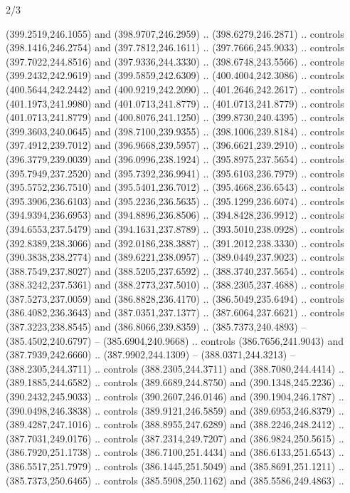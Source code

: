 \begin{flagdescription}{2/3}
\begin{scope}[xshift=0.5\flaglength,yshift=0.5\flagwidth,scale=\flagwidth/495.65]
\begin{scope}[y=0.8pt, x=0.8pt, yscale=-1,shift={(-463.76,-309.78)}]
  (399.2519,246.1055) and (398.9707,246.2959) .. (398.6279,246.2871) .. controls
  (398.1416,246.2754) and (397.7812,246.1611) .. (397.7666,245.9033) .. controls
  (397.7022,244.8516) and (397.9336,244.3330) .. (398.6748,243.5566) .. controls
  (399.2432,242.9619) and (399.5859,242.6309) .. (400.4004,242.3086) .. controls
  (400.5644,242.2442) and (400.9219,242.2090) .. (401.2646,242.2617) .. controls
  (401.1973,241.9980) and (401.0713,241.8779) .. (401.0713,241.8779) .. controls
  (401.0713,241.8779) and (400.8076,241.1250) .. (399.8730,240.4395) .. controls
  (399.3603,240.0645) and (398.7100,239.9355) .. (398.1006,239.8184) .. controls
  (397.4912,239.7012) and (396.9668,239.5957) .. (396.6621,239.2910) .. controls
  (396.3779,239.0039) and (396.0996,238.1924) .. (395.8975,237.5654) .. controls
  (395.7949,237.2520) and (395.7392,236.9941) .. (395.6103,236.7979) .. controls
  (395.5752,236.7510) and (395.5401,236.7012) .. (395.4668,236.6543) .. controls
  (395.3906,236.6103) and (395.2236,236.5635) .. (395.1299,236.6074) .. controls
  (394.9394,236.6953) and (394.8896,236.8506) .. (394.8428,236.9912) .. controls
  (394.6553,237.5479) and (394.1631,237.8789) .. (393.5010,238.0928) .. controls
  (392.8389,238.3066) and (392.0186,238.3887) .. (391.2012,238.3330) .. controls
  (390.3838,238.2774) and (389.6221,238.0957) .. (389.0449,237.9023) .. controls
  (388.7549,237.8027) and (388.5205,237.6592) .. (388.3740,237.5654) .. controls
  (388.3242,237.5361) and (388.2773,237.5010) .. (388.2305,237.4688) .. controls
  (387.5273,237.0059) and (386.8828,236.4170) .. (386.5049,235.6494) .. controls
  (386.4082,236.3643) and (387.0351,237.1377) .. (387.6064,237.6621) .. controls
  (387.3223,238.8545) and (386.8066,239.8359) .. (385.7373,240.4893) --
  (385.4502,240.6797) -- (385.6904,240.9668) .. controls (386.7656,241.9043) and
  (387.7939,242.6660) .. (387.9902,244.1309) -- (388.0371,244.3213) --
  (388.2305,244.3711) .. controls (388.2305,244.3711) and (388.7080,244.4414) ..
  (389.1885,244.6582) .. controls (389.6689,244.8750) and (390.1348,245.2236) ..
  (390.2432,245.9033) .. controls (390.2607,246.0146) and (390.1904,246.1787) ..
  (390.0498,246.3838) .. controls (389.9121,246.5859) and (389.6953,246.8379) ..
  (389.4287,247.1016) .. controls (388.8955,247.6289) and (388.2246,248.2412) ..
  (387.7031,249.0176) .. controls (387.2314,249.7207) and (386.9824,250.5615) ..
  (386.7920,251.1738) .. controls (386.7100,251.4434) and (386.6133,251.6543) ..
  (386.5517,251.7979) .. controls (386.1445,251.5049) and (385.8691,251.1211) ..
  (385.7373,250.6465) .. controls (385.5908,250.1162) and (385.5586,249.4863) ..

\end{scope}
\end{scope}
\end{flagdescription}
